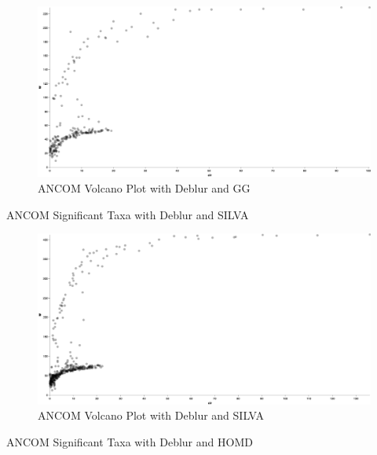 \documentclass[a4paper]{article}
\begin{document}
            \begin{figure}[p]
                \centering
                \includegraphics[width=0.8 \linewidth]{figures/ANCOM/Deblur.gg.png}
                \caption{ANCOM Volcano Plot with Deblur and GG}
                \label{fig:volcano-deblur-gg}
            \end{figure}

            \begin{table}[p]
                \centering
                \caption{ANCOM Significant Taxa with Deblur and SILVA}
                \label{tb:ANCOM-deblur-silva}

            \end{table}

            \begin{figure}[p]
                \centering
                \includegraphics[width=0.8 \linewidth]{figures/ANCOM/Deblur.silva.png}
                \caption{ANCOM Volcano Plot with Deblur and SILVA}
                \label{fig:volcano-deblur-silva}
            \end{figure}

            \begin{table}[p]
                \centering
                \caption{ANCOM Significant Taxa with Deblur and HOMD}
                \label{tb:ANCOM-deblur-homd}

            \end{table}
\end{document}
